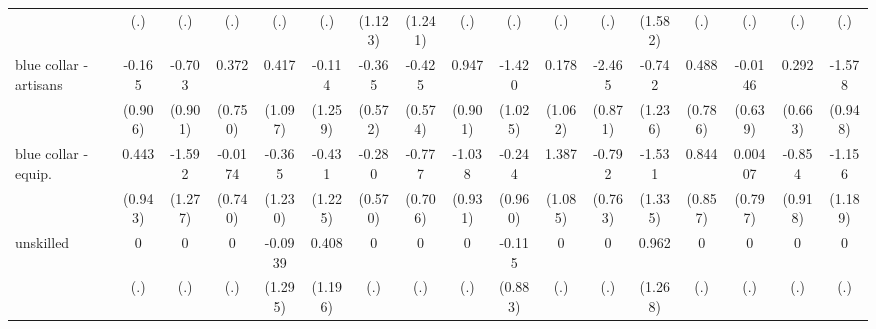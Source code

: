 {\begin{tabular}{l*{16}{c}}
                    &         (.)         &         (.)         &         (.)         &         (.)         &         (.)         &     (1.123)         &     (1.241)         &         (.)         &         (.)         &         (.)         &         (.)         &     (1.582)         &         (.)         &         (.)         &         (.)         &         (.)         \\
[1em]
blue collar - artisans&      -0.165         &      -0.703         &       0.372         &       0.417         &      -0.114         &      -0.365         &      -0.425         &       0.947         &      -1.420         &       0.178         &      -2.465\sym{**} &      -0.742         &       0.488         &     -0.0146         &       0.292         &      -1.578         \\
                    &     (0.906)         &     (0.901)         &     (0.750)         &     (1.097)         &     (1.259)         &     (0.572)         &     (0.574)         &     (0.901)         &     (1.025)         &     (1.062)         &     (0.871)         &     (1.236)         &     (0.786)         &     (0.639)         &     (0.663)         &     (0.948)         \\
[1em]
blue collar - equip.&       0.443         &      -1.592         &     -0.0174         &      -0.365         &      -0.431         &      -0.280         &      -0.777         &      -1.038         &      -0.244         &       1.387         &      -0.792         &      -1.531         &       0.844         &     0.00407         &      -0.854         &      -1.156         \\
                    &     (0.943)         &     (1.277)         &     (0.740)         &     (1.230)         &     (1.225)         &     (0.570)         &     (0.706)         &     (0.931)         &     (0.960)         &     (1.085)         &     (0.763)         &     (1.335)         &     (0.857)         &     (0.797)         &     (0.918)         &     (1.189)         \\
[1em]
unskilled           &           0         &           0         &           0         &     -0.0939         &       0.408         &           0         &           0         &           0         &      -0.115         &           0         &           0         &       0.962         &           0         &           0         &           0         &           0         \\
                    &         (.)         &         (.)         &         (.)         &     (1.295)         &     (1.196)         &         (.)         &         (.)         &         (.)         &     (0.883)         &         (.)         &         (.)         &     (1.268)         &         (.)         &         (.)         &         (.)         &         (.)         \\

\end{tabular}}
